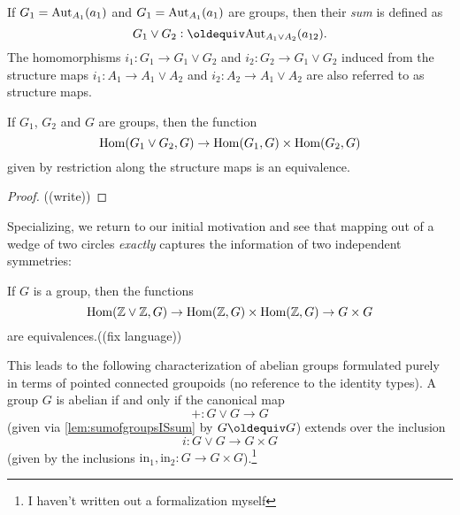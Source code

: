 {\begin{definition}
  \label{def:sumofgroup}
  If $G_1=\mathrm{Aut}_{A_1}(a_1)$ and $G_1=\mathrm{Aut}_{A_1}(a_1)$ are groups, then their \emph{sum} is defined as
  $$G_1\vee G_2\defequi \aut_{A_1\vee A_2}(a_{12}).$$ The homomorphisms $i_1:G_1\to G_1\vee G_2$ and $i_2:G_2\to G_1\vee G_2$ induced from the structure maps  $i_1:A_1\to A_1\vee A_2$ and  $i_2:A_2\to A_1\vee A_2$ are also referred to as structure maps.
\end{definition}
\begin{lemma}
  \label{lem:sumofgroupsISsum} If $G_1$, $G_2$ and $G$ are groups, then the function
  $$\mathrm{Hom}(G_1\vee G_2,G)\to\mathrm{Hom}(G_1,G)\times\mathrm{Hom}(G_2,G)$$ 
given by restriction along the structure maps is an equivalence.
\end{lemma}
\begin{proof}
  ((write))
\end{proof}
Specializing, we return to our initial motivation and see that mapping out of a wedge of two circles \emph{exactly} captures the information of two independent symmetries:
\begin{corollary}
  \label{cor:ZplusZuniv}
  If $G$ is a group, then the functions
  $$\mathrm{Hom}(\mathbb{Z}\vee\mathbb{Z},G)\to \mathrm{Hom}(\mathbb{Z},G)\times\mathrm{Hom}(\mathbb{Z},G)\to G\times G$$
  are equivalences.((fix language))
\end{corollary}
\begin{xca}
This leads to the following characterization of abelian groups formulated purely in terms of pointed connected groupoids (no reference to the identity types).
  \label{xca:whatAREabeliangroups}
  A group $G$ is abelian if and only if the canonical map 
$$+:G\vee G\to G$$ 
(given via \cref{lem:sumofgroupsISsum} by $G\oldequiv G$) extends over the inclusion 
$$i:G\vee G\to G\times G$$ 
(given by the inclusions $\mathrm{in}_1,\mathrm{in}_2:G\to G\times G$).\footnote{I haven't written out a formalization myself}
\end{xca}




}
